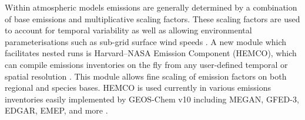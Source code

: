 Within atmospheric models emissions are generally determined by a combination of base emissions and multiplicative scaling factors. 
These scaling factors are used to account for temporal variability as well as allowing environmental parameterisations such as sub-grid surface wind speeds \cite{Ridley_2013,Zender_2003}.
A new module which facilitates nested runs is Harvard–NASA Emission Component (HEMCO), which can compile emissions inventories on the fly from any user-defined temporal or spatial resolution \cite{Keller_2014}.
This module allows fine scaling of emission factors on both regional and species bases.
HEMCO is used currently in various emissions inventories easily implemented by GEOS-Chem v10 including MEGAN, GFED-3, EDGAR, EMEP, and more \cite{Keller_2014}.